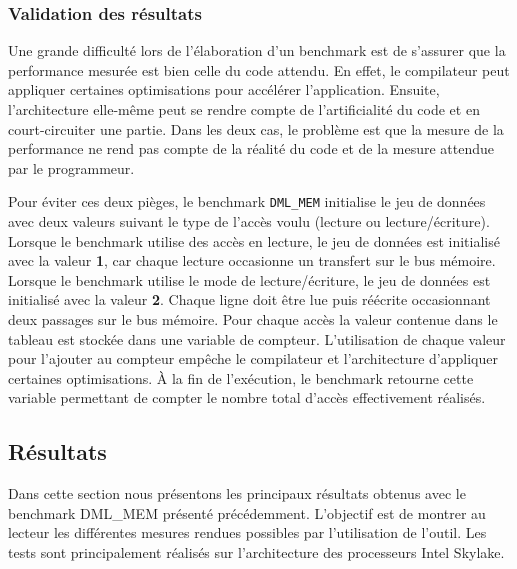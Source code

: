     
    \subsubsection{Validation des résultats}

    Une grande difficulté lors de l'élaboration d'un benchmark est de s'assurer que la performance mesurée est bien celle du code attendu. En effet, le compilateur peut appliquer certaines optimisations pour accélérer l'application. Ensuite, l'architecture elle-même peut se rendre compte de l'artificialité du code et en court-circuiter une partie. Dans les deux cas, le problème est que la mesure de la performance ne rend pas compte de la réalité du code et de la mesure attendue par le programmeur. 
    
    Pour éviter ces deux pièges, le benchmark \verb=DML_MEM= initialise le jeu de données avec deux valeurs suivant le type de l'accès voulu (lecture ou lecture/écriture). Lorsque le benchmark utilise des accès en lecture, le jeu de données est initialisé avec la valeur \textbf{1}, car chaque lecture occasionne un transfert sur le bus mémoire. 
    Lorsque le benchmark utilise le mode de lecture/écriture, le jeu de données est initialisé avec la valeur \textbf{2}. Chaque ligne doit être lue puis réécrite occasionnant deux passages sur le bus mémoire. Pour chaque accès la valeur contenue dans le tableau est stockée dans une variable de compteur.  L'utilisation de chaque valeur pour l'ajouter au compteur empêche le compilateur et l'architecture d'appliquer certaines optimisations. À la fin de l'exécution, le benchmark retourne cette variable permettant de compter le nombre total d'accès effectivement réalisés.
    

    
    
    
    
    
    
    
    
\subsection{Résultats}

    Dans cette section nous présentons les principaux résultats obtenus avec le benchmark DML\_MEM présenté précédemment. L'objectif est de montrer au lecteur les différentes mesures rendues possibles par l'utilisation de l'outil. Les tests sont principalement réalisés sur l'architecture des processeurs Intel Skylake. 


